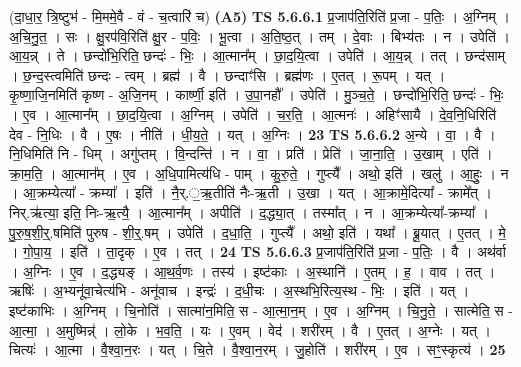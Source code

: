 \documentclass[17pt]{extarticle}
\begin{document}
                  \newline
                      (दा॒धा॒र॒ त्रि॒ष्टुभ॑ - मि॒ममे॒वै - वं - च॒त्वारि॑ च)  \textbf{(A5)} \newline \newline
                                \textbf{ TS 5.6.6.1} \newline
                  प्र॒जाप॑ति॒रिति॑ प्र॒जा - प॒तिः॒ । अ॒ग्निम् । अ॒चि॒नु॒त॒ । सः । क्षु॒रप॑वि॒रिति॑ क्षु॒र - प॒विः॒ । भू॒त्वा । अ॒ति॒ष्ठ॒त् । तम् । दे॒वाः । बिभ्य॑तः । न । उपेति॑ । आ॒य॒न्न् । ते । छन्दो॑भि॒रिति॒ छन्दः॑ - भिः॒ । आ॒त्मान᳚म् । छा॒द॒यि॒त्वा । उपेति॑ । आ॒य॒न्न् । तत् । छन्द॑साम् । छ॒न्द॒स्त्वमिति॑ छन्दः - त्वम् । ब्रह्म॑ । वै । छन्दाꣳ॑सि । ब्रह्म॑णः । ए॒तत् । रू॒पम् । यत् । कृ॒ष्णा॒जि॒नमिति॑ कृष्ण - अ॒जि॒नम् । कार्ष्णी॒ इति॑ । उ॒पा॒नहौ᳚ । उपेति॑ । मु॒ञ्च॒ते॒ । छन्दो॑भि॒रिति॒ छन्दः॑ - भिः॒ । ए॒व । आ॒त्मान᳚म् । छा॒द॒यि॒त्वा । अ॒ग्निम् । उपेति॑ । च॒र॒ति॒ । आ॒त्मनः॑ । अहिꣳ॑सायै । दे॒व॒नि॒धिरिति॑ देव - नि॒धिः । वै । ए॒षः । नीति॑ । धी॒य॒ते॒ । यत् । अ॒ग्निः । \textbf{  23} \newline
                  \newline
                                \textbf{ TS 5.6.6.2} \newline
                  अ॒न्ये । वा॒ । वै । नि॒धिमिति॑ नि - धिम् । अगु॑प्तम् । वि॒न्दन्ति॑ । न । वा॒ । प्रति॑ । प्रेति॑ । जा॒ना॒ति॒ । उ॒खाम् । एति॑ । क्रा॒म॒ति॒ । आ॒त्मान᳚म् । ए॒व । अ॒धि॒पामित्य॑धि - पाम् । कु॒रु॒ते॒ । गुप्त्यै᳚ । अथो॒ इति॑ । खलु॑ । आ॒हुः॒ । न । आ॒क्रम्येत्या᳚ - क्रम्या᳚ । इति॑ । नै॒र्.॒ऋ॒तीति॑ नैः-ऋ॒ती । उ॒खा । यत् । आ॒क्रामे॒दित्या᳚ - क्रामे᳚त् । निर्.ऋ॑त्या॒ इति॒ निः-ऋ॒त्यै॒ । आ॒त्मान᳚म् । अपीति॑ । द॒द्ध्या॒त् । तस्मा᳚त् । न । आ॒क्रम्येत्या᳚-क्रम्या᳚ । पु॒रु॒ष॒शी॒र्॒.षमिति॑ पुरुष - शी॒र्॒.षम् । उपेति॑ । द॒धा॒ति॒ । गुप्त्यै᳚ । अथो॒ इति॑ । यथा᳚ । ब्रू॒यात् । ए॒तत् । मे॒ । गो॒पा॒य॒ । इति॑ । ता॒दृक् । ए॒व । तत् । \textbf{  24} \newline
                  \newline
                                \textbf{ TS 5.6.6.3} \newline
                  प्र॒जाप॑ति॒रिति॑ प्र॒जा - प॒तिः॒ । वै । अथ॑र्वा । अ॒ग्निः । ए॒व । द॒द्ध्यङ् । आ॒थ॒र्व॒णः । तस्य॑ । इष्ट॑काः । अ॒स्थानि॑ । ए॒तम् । ह॒ । वाव । तत् । ऋषिः॑ । अ॒भ्यनू॑वा॒चेत्य॑भि - अनू॑वाच । इन्द्रः॑ । द॒धी॒चः । अ॒स्थभि॒रित्य॒स्थ - भिः॒ । इति॑ । यत् । इष्ट॑काभिः । अ॒ग्निम् । चि॒नोति॑ । सात्मा॑न॒मिति॒ स - आ॒त्मा॒न॒म् । ए॒व । अ॒ग्निम् । चि॒नु॒ते॒ । सात्मेति॒ स - आ॒त्मा॒ । अ॒मुष्मिन्न्॑ । लो॒के । भ॒व॒ति॒ । यः । ए॒वम् । वेद॑ । शरी॑रम् । वै । ए॒तत् । अ॒ग्नेः । यत् । चित्यः॑ । आ॒त्मा । वै॒श्वा॒न॒रः । यत् । चि॒ते । वै॒श्वा॒न॒रम् । जु॒होति॑ । शरी॑रम् । ए॒व । सꣳ॒॒स्कृत्य॑ । \textbf{  25} \newline
\end{document}
